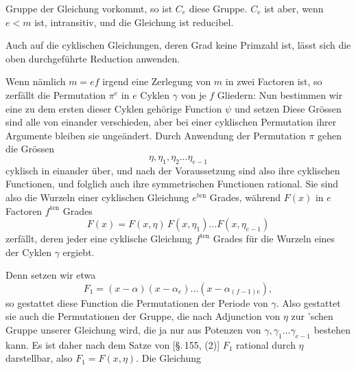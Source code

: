 Gruppe der Gleichung vorkommt, so ist $C_e$ diese Gruppe. $C_e$ ist aber, wenn $e < m$ ist, intransitiv, und die Gleichung ist reducibel.

Auch auf die cyklischen Gleichungen, deren Grad keine Primzahl ist, lässt sich die oben durchgeführte Reduction anwenden.

Wenn nämlich $m = ef$ irgend eine Zerlegung von $m$ in zwei Factoren ist, so zerfällt die Permutation $\pi^e$ in $e$ Cyklen $\gamma$ von je $f$ Gliedern:
Nun bestimmen wir eine zu dem ersten dieser Cyklen gehörige Function $\psi$ und setzen
Diese Grössen sind alle von einander verschieden, aber bei einer cyklischen Permutation ihrer Argumente bleiben sie ungeändert. Durch Anwendung der Permutation $\pi$ gehen die Grössen
\[
\eta, \eta_1, \eta_2 \ldots \eta_{e-1}
\]
cyklisch in einander über, und nach der Voraussetzung sind also ihre cyklischen Functionen, und folglich auch ihre symmetrischen Functionen rational. Sie sind also die Wurzeln einer cyklischen Gleichung $e^{\mathrm{ten}}$ Grades, während $F(x)$ in $e$ Factoren $f^{\mathrm{ten}}$ Grades
\[
F(x) = F(x, \eta)\, F(x, \eta_1) \ldots F(x, \eta_{e-1})
\]
zerfällt, deren jeder eine cyklische Gleichung $f^{\mathrm{ten}}$ Grades für die Wurzeln eines der Cyklen $\gamma$ ergiebt.

Denn setzen wir etwa
\[
F_1 = (x - \alpha)(x - \alpha_e) \ldots (x - \alpha_{(f-1)e}),
\]
so gestattet diese Function die Permutationen der Periode von $\gamma$. Also gestattet sie auch die Permutationen der Gruppe, die nach Adjunction von $\eta$ zur 'schen Gruppe unserer Gleichung wird, die ja nur aus Potenzen von $\gamma, \gamma_1 \ldots \gamma_{e-1}$ bestehen kann. Es ist daher nach dem Satze von  [\S.\,155, (2)] $F_1$ rational durch $\eta$ darstellbar, also $F_1 = F(x, \eta)$. Die Gleichung
